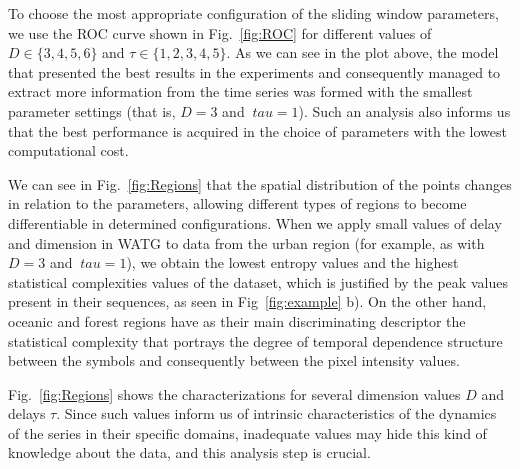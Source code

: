 \documentclass[journal]{IEEEtran}
\begin{document}
	To choose the most appropriate configuration of the sliding window parameters, we use the ROC curve shown in Fig.~\ref{fig:ROC} for different values of $D \in \{3, 4, 5, 6 \} $ and $\tau \in \{1, 2, 3, 4, 5 \}$.
	As we can see in the plot above, the model that presented the best results in the experiments and consequently managed to extract more information from the time series was formed with the smallest parameter settings (that is, $ D = 3 $ and $ \ tau = 1 $).
	Such an analysis also informs us that the best performance is acquired in the choice of parameters with the lowest computational cost.
	
	We can see in Fig.~\ref{fig:Regions} that the spatial distribution of the points changes in relation to the parameters, allowing different types of regions to become differentiable in determined configurations.
	When we apply small values of delay and dimension in WATG to data from the urban region (for example, as with $ D = 3 $ and $ \ tau = 1 $), we obtain the lowest entropy values and the highest statistical complexities values of the dataset, which is justified by the peak values present in their sequences, as seen in Fig~\ref{fig:example} b).
	On the other hand, oceanic and forest regions have as their main discriminating descriptor the statistical complexity that portrays the degree of temporal dependence structure between the symbols and consequently between the pixel intensity values.
	
	Fig.~\ref{fig:Regions} shows the characterizations for several dimension values $D$ and delays $\tau$.
	Since such values inform us of intrinsic characteristics of the dynamics of the series in their specific domains, inadequate values may hide this kind of knowledge about the data, and this analysis step is crucial.
	
\end{document}
